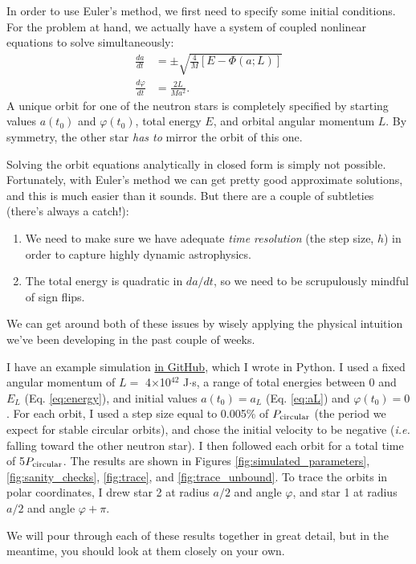 \documentclass[11pt]{article}
\begin{document}
\begin{enumerate}
\hspace{15pt} In order to use Euler's method, we first need to specify some initial conditions. For the problem at hand, we actually have a system of coupled nonlinear equations to solve simultaneously:
\begin{align*}
\frac{da}{dt} &= \pm \sqrt{ \frac{4}{M} \left[ E - \Phi(a; L) \right] } \\
\frac{d\varphi}{dt} &= \frac{2L}{Ma^2}.
\end{align*}
A unique orbit for one of the neutron stars is completely specified by starting values $a(t_0)$ and $\varphi(t_0)$, total energy $E$, and orbital angular momentum $L$. By symmetry, the other star \emph{has to} mirror the orbit of this one.

\hspace{2pt} Solving the orbit equations analytically in closed form is simply not possible. Fortunately, with Euler's method we can get pretty good approximate solutions, and this is much easier than it sounds. But there are a couple of subtleties (there's always a catch!):
\begin{enumerate}
\item We need to make sure we have adequate \textit{time resolution} (the step size, $h$) in order to capture highly dynamic astrophysics.

\item The total energy is quadratic in $da/dt$, so we need to be scrupulously mindful of sign flips.
\end{enumerate}
We can get around both of these issues by wisely applying the physical intuition we've been developing in the past couple of weeks.

\hspace{15pt}I have an example simulation \href{https://github.com/alurban/mentoring/blob/master/tidal_distortion/scripts/kepler_orbits.py}{in GitHub}, which I wrote in Python. I used a fixed angular momentum of $L=$ 4$\times$10$^{42}$ J$\cdot$s, a range of total energies between 0 and $E_L$ (Eq. \ref{eq:energy}), and initial values $a(t_0) = a_L$ (Eq. \ref{eq:aL}) and $\varphi(t_0) = 0$. For each orbit, I used a step size equal to 0.005\% of $P_{\rm circular}$ (the period we expect for stable circular orbits), and chose the initial velocity to be negative (\textit{i.e.} falling toward the other neutron star). I then followed each orbit for a total time of 5$P_{\rm circular}$. The results are shown in Figures \ref{fig:simulated_parameters}, \ref{fig:sanity_checks}, \ref{fig:trace}, and \ref{fig:trace_unbound}. To trace the orbits in polar coordinates, I drew star 2 at radius $a/2$ and angle $\varphi$, and star 1 at radius $a/2$ and angle $\varphi + \pi$.

\hspace{15pt}We will pour through each of these results together in great detail, but in the meantime, you should look at them closely on your own.

\end{enumerate}
\end{document}
